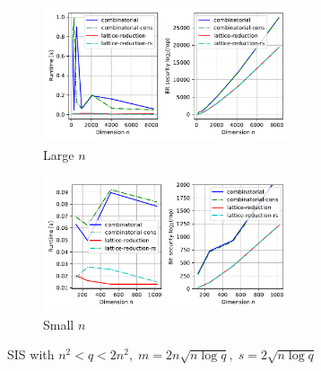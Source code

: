 \begin{figure}[h!]
    \centering
    \begin{subfigure}{1\textwidth}
        \centering
        \includegraphics[width=0.8\textwidth]{graphics/SIS_plot.pdf}
        \caption{Large $n$}
    \end{subfigure}
    \begin{subfigure}{1\textwidth}
        \centering
        \includegraphics[width=0.8\textwidth]{graphics/SIS_plot_small.pdf}
        \caption{Small $n$}
    \end{subfigure}
    \caption{SIS with $n^2 < q < 2n^2, \; m = 2n \sqrt{n \log q}, \; s = 2 \sqrt{n \log q}$}\label{fig:SIS-algs}
\end{figure}

